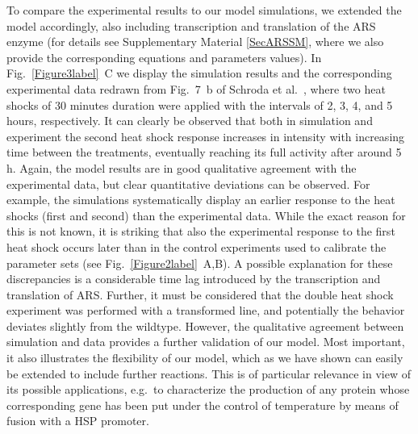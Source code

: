 \documentclass[oneside, 10pt, a4paper, twocolumn]{article}
\begin{document}
To compare the experimental results to our model simulations, we extended the model
accordingly, also including transcription and translation of the ARS enzyme (for details see Supplementary Material \ref{SecARSSM}, where we also provide the corresponding equations and parameters values). %
In Fig.~\ref{Figure3label}~C we display the simulation results and the corresponding experimental data redrawn from Fig.~7~b of Schroda et al.~\cite{Schroda2000}, where two heat shocks of 30 minutes duration were 
applied with the intervals of 2, 3, 4, and 5 hours, respectively. 
It can clearly be observed that both in simulation and experiment the second heat shock response
increases in intensity with increasing time between the treatments, eventually reaching
its full activity after around 5 h. Again, the model results are in good qualitative 
agreement with the experimental data, {but clear quantitative deviations can be observed. 
For example, the simulations systematically display an earlier response to the heat shocks (first and second) 
than the experimental data. While the exact reason for this is not known, it is striking that also the experimental response 
to the first heat shock occurs later than in the control experiments used to calibrate the parameter sets (see Fig.~\ref{Figure2label}~A,B). 
A possible explanation for these discrepancies is a considerable time lag introduced by the transcription and translation of ARS. 
Further, it must be considered that the double heat shock experiment was performed with a transformed line, and potentially the
behavior deviates slightly from the wildtype.
However, the qualitative agreement between simulation and data} provides a further validation of our model. Most important, it also illustrates the flexibility of our model, which as we have shown can easily be extended to include further reactions. This is of particular relevance in view of its possible applications, e.g.~to characterize the production of any protein whose corresponding gene has been put under the control of temperature by means of fusion with a HSP promoter.
\end{document}
